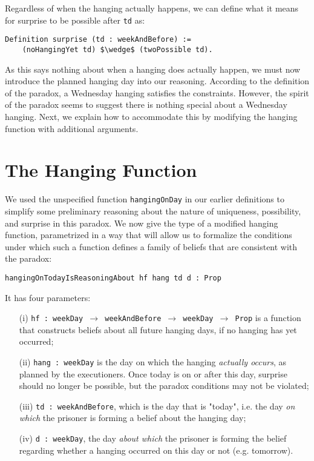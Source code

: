 \documentclass[runningheads]{llncs}
\begin{document}
Regardless of when the hanging actually happens, we can define what it means
for surprise to be possible after {\tt td} as:

\begin{lstlisting}[mathescape=true]
  Definition surprise (td : weekAndBefore) :=
    (noHangingYet td) $\wedge$ (twoPossible td).
\end{lstlisting}

As this says nothing about when a hanging does actually happen, we must now introduce
the planned hanging day into our reasoning.
According to the definition of the paradox, a Wednesday hanging satisfies
the constraints. However, the spirit of the paradox seems to suggest there is nothing
special about a Wednesday hanging. Next, we explain how to accommodate this by
modifying the hanging function with additional arguments.

\section{The Hanging Function}
\label{sec:hang-func}

We used the unspecified function {\tt hangingOnDay} in our earlier definitions to simplify
some preliminary reasoning about the nature of uniqueness, possibility, and
surprise in this paradox.
We now give the type of a modified hanging function, parametrized in a way that will
allow us to formalize the conditions under which such a function defines a family
of beliefs that are consistent with the paradox:
\newline

{\tt hangingOnTodayIsReasoningAbout hf hang td d : Prop} \newline

It has four parameters:

\begin{itemize}
  \item[(i)] {\tt hf  : weekDay $\to$ weekAndBefore $\to$ weekDay $\to$ Prop} is
  a function that constructs beliefs about all future hanging days, if no
  hanging has yet occurred;
  \item[(ii)] {\tt hang : weekDay} is the day on which the hanging \emph{actually occurs},
  as planned by the executioners.
  Once today is on or after this day, surprise should no longer be possible, but the paradox
  conditions may not be violated;
  \item[(iii)] {\tt td : weekAndBefore}, which is the day that is "today", i.e. the day
  \emph{on which} the prisoner is forming a belief about the hanging day;
  \item[(iv)] {\tt d : weekDay}, the day \emph{about which} the prisoner is forming the belief
  regarding whether a hanging occurred on this day or not (e.g. tomorrow).
\end{itemize}
\end{document}
